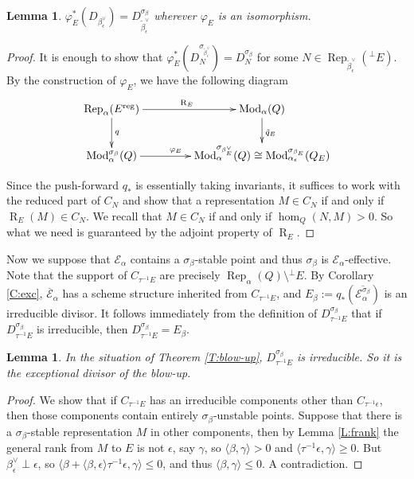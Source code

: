 \documentclass{amsart}
\newtheorem{lemma}[theorem]{Lemma}
\theoremstyle{definition}
\theoremstyle{remark}
\numberwithin{equation}{section}
\begin{document}
\begin{lemma} \label{L:pullbackD} $\varphi_E^*(D_{\beta_\epsilon^\vee})=D_{\tilde{\beta}_\epsilon^\vee}^{\sigma_\beta}$ wherever $\varphi_E$ is an isomorphism.
\end{lemma}
\begin{proof} It is enough to show that $\varphi_E^*(D_N^{\sigma_{\tilde{\beta}_\epsilon^\vee}})=D_N^{\sigma_\beta}$ for some $N\in{\operatorname{Rep}}_{\tilde{\beta}_\epsilon^\vee}({{^\perp}\!} E)$. 
By the construction of $\varphi_E$, we have the following diagram
$$\xymatrix @C=3.6pc {
{\operatorname{Rep}}_\alpha(E^{{\operatorname{reg}}}) \ar[r]^{{\operatorname{R}}_E} \ar[d]^{q}  & {\operatorname{Mod}}_\alpha(Q) \ar[d]^{\tilde{q}_E}\\
{\operatorname{Mod}}_\alpha^{\sigma_\beta}(Q) \ar[r]^{\varphi_E\qquad} & {\operatorname{Mod}}_\alpha^{\sigma_{\beta_E^\vee}}(Q) \cong {\operatorname{Mod}}_{\alpha_\epsilon}^{\sigma_{\beta_E}}(Q_E)
}$$

Since the push-forward $q_*$ is essentially taking invariants, it suffices to work with the reduced part of $C_N$ and show that a representation $M\in C_N$ if and only if ${\operatorname{R}}_E(M)\in C_N$. We recall that $M\in C_N$ if and only if $\hom_Q(N,M)>0$. So what we need is guaranteed by the adjoint property of ${\operatorname{R}}_E$.
\end{proof}

Now we suppose that ${\mathcal{{E}}}_\alpha$ contains a $\sigma_\beta$-stable point and thus $\sigma_\beta$ is ${\mathcal{{E}}}_\alpha$-effective. Note that the support of $C_{\tau^{-1} E}$ are precisely ${\operatorname{Rep}}_\alpha(Q)\setminus {{^\perp}\!} E$. By Corollary \ref{C:exc}, $\overline{{\mathcal{{E}}}}_\alpha$ has a scheme structure inherited from $C_{\tau^{-1} E}$, and $E_\beta:=q_*(\overline{{\mathcal{{E}}}_\alpha^{\sigma_\beta}})$ is an irreducible divisor. It follows immediately from the definition of $D_{\tau^{-1} E}^{\sigma_\beta}$ that if $D_{\tau^{-1} E}^{\sigma_\beta}$ is irreducible, then $D_{\tau^{-1} E}^{\sigma_\beta}=E_\beta$.

\begin{lemma} \label{L:Ebeta} In the situation of Theorem \ref{T:blow-up}, $D_{\tau^{-1} E}^{\sigma_\beta}$ is irreducible. So it is the exceptional divisor of the blow-up.
\end{lemma}
\begin{proof} We show that if $C_{\tau^{-1} E}$ has an irreducible components other than $C_{\tau^{-1}\epsilon}$, then those components contain entirely $\sigma_\beta$-unstable points. Suppose that there is a $\sigma_\beta$-stable representation $M$ in other components, then by Lemma \ref{L:frank} the general rank from $M$ to $E$ is not $\epsilon$, say $\gamma$, so ${\langle{\beta,\gamma}\rangle}> 0$ and ${\langle{\tau^{-1}\epsilon,\gamma}\rangle}\geqslant 0$. But $\beta_\epsilon^\vee\perp\epsilon$, so ${\langle{\beta+{\langle{\beta,\epsilon}\rangle}\tau^{-1}\epsilon,\gamma}\rangle}\leqslant 0$, and thus ${\langle{\beta,\gamma}\rangle}\leqslant0$. A contradiction.
\end{proof}
\end{document}
